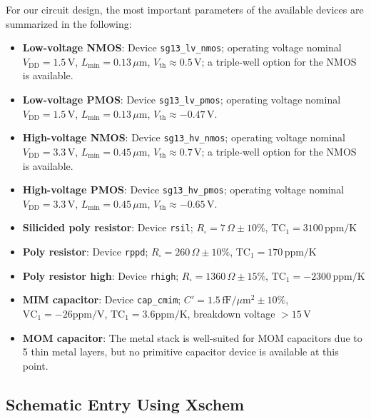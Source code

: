 \documentclass[
  a4paper,
  DIV=11,
  numbers=noendperiod]{scrartcl}
\providecommand{\tightlist}{%
  \setlength{\itemsep}{0pt}\setlength{\parskip}{0pt}}\usepackage{longtable,booktabs,array}
\begin{document}
For our circuit design, the most important parameters of the available
devices are summarized in the following:

\begin{itemize}
\tightlist
\item
  \textbf{Low-voltage NMOS}: Device \texttt{sg13\_lv\_nmos}; operating
  voltage nominal \(V_\mathrm{DD}=1.5\,\text{V}\),
  \(L_\mathrm{min}=0.13\,\mu\text{m}\),
  \(V_\mathrm{th}\approx 0.5\,\text{V}\); a triple-well option for the
  NMOS is available.
\item
  \textbf{Low-voltage PMOS}: Device \texttt{sg13\_lv\_pmos}; operating
  voltage nominal \(V_\mathrm{DD}=1.5\,\text{V}\),
  \(L_\mathrm{min}=0.13\,\mu\text{m}\),
  \(V_\mathrm{th}\approx -0.47\,\text{V}\).
\item
  \textbf{High-voltage NMOS}: Device \texttt{sg13\_hv\_nmos}; operating
  voltage nominal \(V_\mathrm{DD}=3.3\,\text{V}\),
  \(L_\mathrm{min}=0.45\,\mu\text{m}\),
  \(V_\mathrm{th}\approx 0.7\,\text{V}\); a triple-well option for the
  NMOS is available.
\item
  \textbf{High-voltage PMOS}: Device \texttt{sg13\_hv\_pmos}; operating
  voltage nominal \(V_\mathrm{DD}=3.3\,\text{V}\),
  \(L_\mathrm{min}=0.45\,\mu\text{m}\),
  \(V_\mathrm{th}\approx -0.65\,\text{V}\).
\item
  \textbf{Silicided poly resistor}: Device \texttt{rsil};
  \(R_\square=7\,\Omega \pm 10\%\), \(\text{TC}_1=3100\,\text{ppm/K}\)
\item
  \textbf{Poly resistor}: Device \texttt{rppd};
  \(R_\square=260\,\Omega \pm 10\%\), \(\text{TC}_1=170\,\text{ppm/K}\)
\item
  \textbf{Poly resistor high}: Device \texttt{rhigh};
  \(R_\square=1360\,\Omega \pm 15\%\),
  \(\text{TC}_1=-2300\,\text{ppm/K}\)
\item
  \textbf{MIM capacitor}: Device \texttt{cap\_cmim};
  \(C'=1.5\,\text{fF}/\mu\text{m}^2 \pm 10\%\),
  \(\text{VC}_1=-26\text{ppm/V}\), \(\text{TC}_1=3.6\text{ppm/K}\),
  breakdown voltage \(>15\,\text{V}\)
\item
  \textbf{MOM capacitor}: The metal stack is well-suited for MOM
  capacitors due to 5 thin metal layers, but no primitive capacitor
  device is available at this point.
\end{itemize}

\subsection{Schematic Entry Using
Xschem}\label{schematic-entry-using-xschem}
\end{document}
